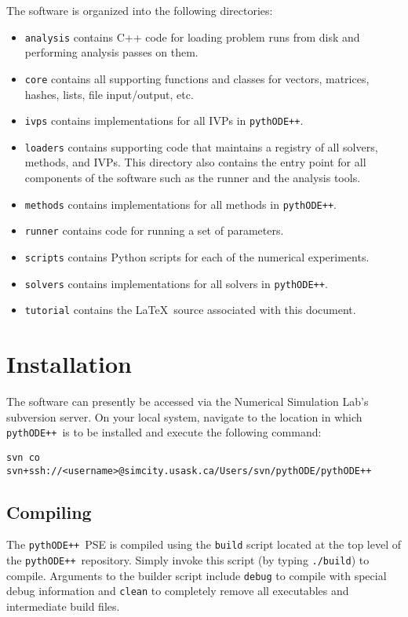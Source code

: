 \documentclass[11pt]{article}
\newcommand{\pypp}{\texttt{pythODE++}}
\begin{document}
The software is organized into the following directories:
\begin{itemize}
\item \verb=analysis= contains C++ code for loading problem runs from disk and performing analysis passes on them.
\item \verb=core= contains all supporting functions and classes for vectors, matrices, hashes, lists, file input/output, etc.
\item \verb=ivps= contains implementations for all \acp{IVP} in \pypp.
\item \verb=loaders= contains supporting code that maintains a registry of all solvers, methods, and IVPs. This directory also contains the entry point for all components of the software such as the runner and the analysis tools.
\item \verb=methods= contains implementations for all methods in \pypp.
\item \verb=runner= contains code for running a set of parameters.
\item \verb=scripts= contains Python scripts for each of the numerical experiments.
\item \verb=solvers= contains implementations for all solvers in \pypp.
\item \verb=tutorial= contains the \LaTeX\ source associated with this document.
\end{itemize}

\section{Installation}
\label{installation}

The software can presently be accessed via the Numerical Simulation
Lab's subversion server. On your local system, navigate to the
location in which \pypp\ is to be installed and execute the following
command:
\begin{verbatim}
svn co svn+ssh://<username>@simcity.usask.ca/Users/svn/pythODE/pythODE++
\end{verbatim}

\subsection{Compiling}

The \pypp\ PSE is compiled using the \verb=build= script located at
the top level of the \pypp\ repository. Simply invoke this script (by
typing \verb=./build=) to compile. Arguments to the builder script
include \verb=debug= to compile with special debug information and
\verb=clean= to completely remove all executables and intermediate
build files.
\end{document}
